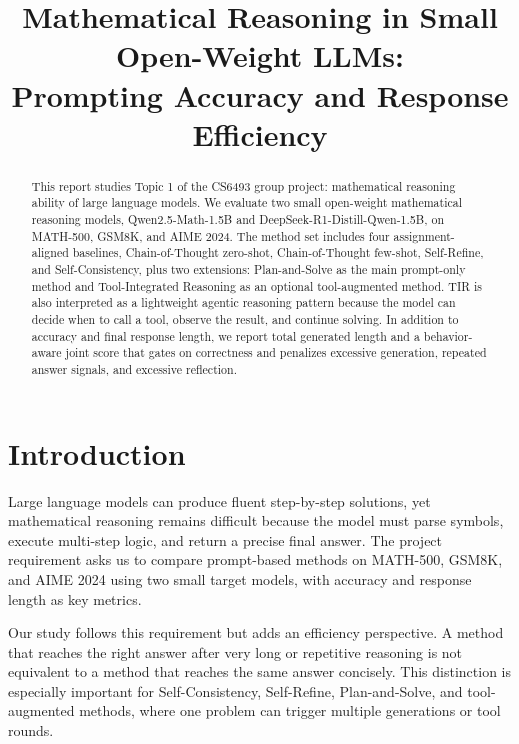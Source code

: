 \documentclass[conference]{IEEEtran}
\newcommand{\qwen}{Qwen2.5-Math-1.5B}
\newcommand{\deepseek}{DeepSeek-R1-Distill-Qwen-1.5B}
\newcommand{\mathfive}{MATH-500}
\begin{document}
\title{Mathematical Reasoning in Small Open-Weight LLMs:\\Prompting Accuracy and Response Efficiency}

\author{
}

\maketitle

\begin{abstract}
This report studies Topic 1 of the CS6493 group project: mathematical reasoning ability of large language models. We evaluate two small open-weight mathematical reasoning models, \qwen{} and \deepseek{}, on \mathfive{}, GSM8K, and AIME 2024. The method set includes four assignment-aligned baselines, Chain-of-Thought zero-shot, Chain-of-Thought few-shot, Self-Refine, and Self-Consistency, plus two extensions: Plan-and-Solve as the main prompt-only method and Tool-Integrated Reasoning as an optional tool-augmented method. TIR is also interpreted as a lightweight agentic reasoning pattern because the model can decide when to call a tool, observe the result, and continue solving. In addition to accuracy and final response length, we report total generated length and a behavior-aware joint score that gates on correctness and penalizes excessive generation, repeated answer signals, and excessive reflection.
\end{abstract}

\section{Introduction}
Large language models can produce fluent step-by-step solutions, yet mathematical reasoning remains difficult because the model must parse symbols, execute multi-step logic, and return a precise final answer. The project requirement asks us to compare prompt-based methods on \mathfive{}, GSM8K, and AIME 2024 using two small target models, with accuracy and response length as key metrics.

Our study follows this requirement but adds an efficiency perspective. A method that reaches the right answer after very long or repetitive reasoning is not equivalent to a method that reaches the same answer concisely. This distinction is especially important for Self-Consistency, Self-Refine, Plan-and-Solve, and tool-augmented methods, where one problem can trigger multiple generations or tool rounds.
\end{document}
